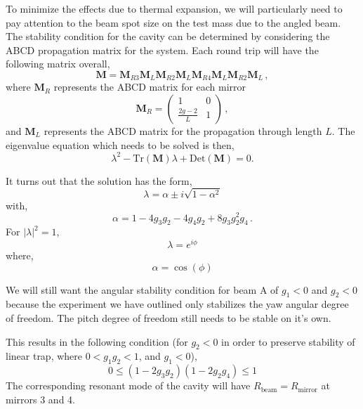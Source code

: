 To minimize the effects due to thermal expansion, we will particularly need to
pay attention to the beam spot size on the test mass due to the angled beam.
The stability condition for the cavity can be determined by considering the
ABCD propagation matrix for the system. Each round trip will have the following
matrix overall,
\begin{equation}
\mathbf{M} = \mathbf{M}_{R3} \mathbf{M}_L \mathbf{M}_{R2} \mathbf{M}_L
  \mathbf{M}_{R4} \mathbf{M}_L \mathbf{M}_{R2} \mathbf{M}_L \, ,
\end{equation}
where $\mathbf{M}_R$ represents the ABCD matrix for each mirror
\begin{equation}
\mathbf{M}_R =
\begin{pmatrix}
1 & 0 \\
\frac{2g-2}{L} & 1
\end{pmatrix} \,,
\end{equation}
and
$\mathbf{M}_L$ represents
the ABCD matrix for the propagation through length $L$.
The eigenvalue equation which needs to be solved is then,
\begin{equation}
\lambda^2-\mathrm{Tr}(\mathbf{M})\lambda+\mathrm{Det}(\mathbf{M}) = 0.
\end{equation}

It turns out that the solution has the form,
\begin{equation}
\lambda = \alpha \pm i \sqrt{1-\alpha^2}
\end{equation}
with,
\begin{equation}
\alpha = 1-4g_3g_2-4g_4g_2+8g_3g_2^2g_4 \, .
\end{equation}
For $|\lambda|^2 = 1$,
\begin{equation}
\lambda = e^{ i\phi}
\end{equation}
where,
\begin{equation}
\alpha = \cos(\phi)
\end{equation}

We will still want the angular stability condition for beam A of
$g_1 < 0$ and $g_2 < 0$ because the experiment we have outlined only stabilizes
the yaw angular degree of freedom.
The pitch degree of freedom still needs to be stable on it's own.

This results in the following condition (for $g_2 < 0$ in order to preserve
stability of linear trap, where $0 < g_1g_2 < 1$, and $g_1 < 0$),
\begin{equation}
0 \leq \left( 1-2g_3g_2\right)\left(1-2g_2g_4\right) \leq 1
\end{equation}
The corresponding resonant mode of the cavity will have
$R_\mathrm{beam} = R_\mathrm{mirror}$ at mirrors 3 and 4.


